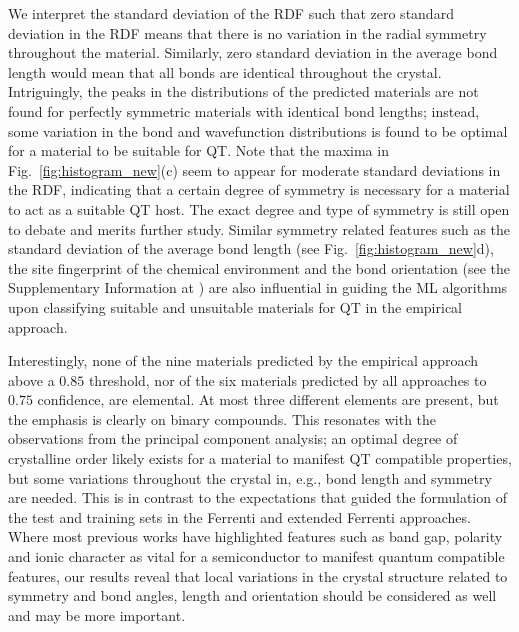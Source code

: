 \documentclass[superscriptaddress,unsortedaddress,
 amsmath,amssymb,
 aps,
]{revtex4-2}
\begin{document}
We interpret the standard deviation  of the RDF such that zero standard deviation in the RDF means that there is no variation in the radial symmetry throughout the material. Similarly, zero standard deviation in the average bond length would mean that all bonds are identical throughout the crystal. Intriguingly, the peaks in the distributions of the predicted materials are not found for perfectly symmetric materials with identical bond lengths; instead, some variation in the bond and wavefunction distributions is found to be optimal for a material to be suitable for QT.  
Note that the maxima in Fig.~\ref{fig:histogram_new}(c) seem to appear for moderate standard deviations in the RDF, indicating that a certain degree of symmetry is necessary for a material to act as a suitable QT host. The exact degree and type of symmetry is still open to debate and merits further study. 
Similar symmetry related features such as the standard deviation of the average bond length (see Fig.~\ref{fig:histogram_new}d), the site fingerprint of the chemical environment and the bond orientation (see the Supplementary Information at \cite{supplementary}) are also influential in guiding the ML algorithms upon classifying suitable and unsuitable materials for QT in the empirical approach. 


Interestingly, none of the nine materials predicted by the empirical approach above a $0.85$ threshold, nor of the six materials predicted by all approaches to $0.75$ confidence, are elemental. At most three different elements are present, but the emphasis is clearly on binary compounds. This resonates with the observations from the principal component analysis; an optimal degree of crystalline order likely exists for a material to manifest QT compatible properties, but some variations throughout the crystal in, e.g., bond length and symmetry are needed. This is in contrast to the expectations that guided the formulation of the test and training sets in the Ferrenti and extended Ferrenti approaches. Where most previous works have highlighted features such as band gap, polarity and ionic character as vital for a semiconductor to manifest quantum compatible features, our results reveal that local variations in the crystal structure related to symmetry and bond angles, length and orientation should be considered as well and may be more important. 
\end{document}
